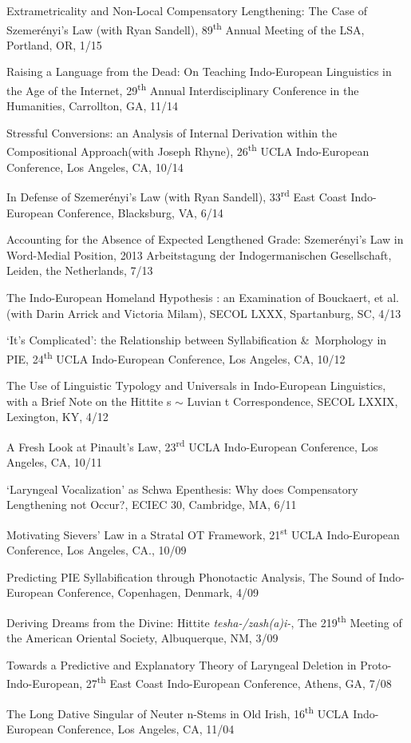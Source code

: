 \documentclass[paper=letter,fontsize=11pt,enabledeprecatedfontcommands]{scrartcl} %
\newcommand{\TalkEntry}[4]{
		\noindent #1, #2, #3 #4}
\begin{document}
\begin{etaremune}
\item\TalkEntry{Extrametricality and Non-Local Compensatory Lengthening: The Case of Szemerényi’s Law (with Ryan Sandell)}{89\textsuperscript{th} Annual Meeting of the LSA, Portland, OR}{1/15}
\item\TalkEntry{Raising a Language from the Dead: On Teaching Indo-European Linguistics in the Age of the Internet}{29\textsuperscript{th} Annual Interdisciplinary Conference in the Humanities, Carrollton, GA}{11/14}
\item\TalkEntry{Stressful Conversions: an Analysis of Internal Derivation within the Compositional Approach(with Joseph Rhyne)}{26\textsuperscript{th} UCLA Indo-European Conference, Los Angeles, CA}{10/14}
\item\TalkEntry{In Defense of Szemerényi’s Law (with Ryan Sandell)}{33\textsuperscript{rd} East Coast Indo-European Conference, Blacksburg, VA}{6/14}
\item\TalkEntry{Accounting for the Absence of Expected Lengthened Grade: Szemerényi's Law in Word-Medial Position}{2013 Arbeitstagung der Indogermanischen Gesellschaft, Leiden, the Netherlands}{7/13}
\item\TalkEntry{The Indo-European Homeland Hypothesis : an Examination of Bouckaert, et al. (with Darin Arrick and Victoria Milam)}{SECOL LXXX, Spartanburg, SC}{4/13}
\item\TalkEntry{`It's Complicated': the Relationship between Syllabification \&~Morphology in PIE}{24\textsuperscript{th} UCLA Indo-European Conference, Los Angeles, CA}{10/12}
\item\TalkEntry{The Use of Linguistic Typology and Universals in Indo-European Linguistics, with a Brief Note on the Hittite s $\sim$ Luvian t Correspondence}{SECOL LXXIX, Lexington, KY}{4/12}
\item\TalkEntry{A Fresh Look at Pinault’s Law}{23\textsuperscript{rd} UCLA Indo-European Conference, Los Angeles, CA}{10/11}
\item\TalkEntry{`Laryngeal Vocalization’ as Schwa Epenthesis: Why does Compensatory Lengthening not Occur?}{ECIEC 30, Cambridge, MA}{6/11} 
\item\TalkEntry{Motivating Sievers’ Law in a Stratal OT Framework}{21\textsuperscript{st} UCLA Indo-European Conference, Los Angeles, CA.}{10/09}
\item\TalkEntry{Predicting PIE Syllabification through Phonotactic Analysis}{The Sound of Indo-European Conference, Copenhagen, Denmark}{4/09} 
\item\TalkEntry{Deriving Dreams from the Divine: Hittite \textit{tesha-/zash(a)i-}}{The 219\textsuperscript{th} Meeting of the American Oriental Society, Albuquerque, NM}{3/09} 
\item\TalkEntry{Towards a Predictive and Explanatory Theory of Laryngeal Deletion in Proto-Indo-European}{27\textsuperscript{th} East Coast Indo-European Conference, Athens, GA}{7/08}
\item\TalkEntry{The Long Dative Singular of Neuter n-Stems in Old Irish}{16\textsuperscript{th} UCLA Indo-European Conference, Los Angeles, CA}{11/04}
\end{etaremune}
\end{document}

